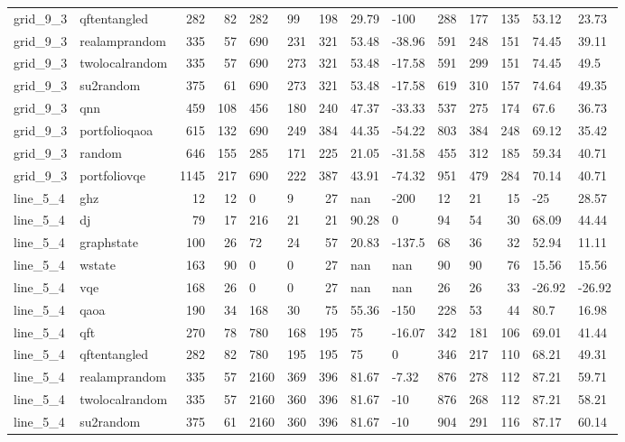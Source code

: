\begin{longtable}{llrrllrllllrll}
grid\_9\_3 & qftentangled & 282 & 82 & 282 & 99 & 198 & 29.79 & -100 & 288 & 177 & 135 & 53.12 & 23.73 \\
grid\_9\_3 & realamprandom & 335 & 57 & 690 & 231 & 321 & 53.48 & -38.96 & 591 & 248 & 151 & 74.45 & 39.11 \\
grid\_9\_3 & twolocalrandom & 335 & 57 & 690 & 273 & 321 & 53.48 & -17.58 & 591 & 299 & 151 & 74.45 & 49.5 \\
grid\_9\_3 & su2random & 375 & 61 & 690 & 273 & 321 & 53.48 & -17.58 & 619 & 310 & 157 & 74.64 & 49.35 \\
grid\_9\_3 & qnn & 459 & 108 & 456 & 180 & 240 & 47.37 & -33.33 & 537 & 275 & 174 & 67.6 & 36.73 \\
grid\_9\_3 & portfolioqaoa & 615 & 132 & 690 & 249 & 384 & 44.35 & -54.22 & 803 & 384 & 248 & 69.12 & 35.42 \\
grid\_9\_3 & random & 646 & 155 & 285 & 171 & 225 & 21.05 & -31.58 & 455 & 312 & 185 & 59.34 & 40.71 \\
grid\_9\_3 & portfoliovqe & 1145 & 217 & 690 & 222 & 387 & 43.91 & -74.32 & 951 & 479 & 284 & 70.14 & 40.71 \\
line\_5\_4 & ghz & 12 & 12 & 0 & 9 & 27 & nan & -200 & 12 & 21 & 15 & -25 & 28.57 \\
line\_5\_4 & dj & 79 & 17 & 216 & 21 & 21 & 90.28 & 0 & 94 & 54 & 30 & 68.09 & 44.44 \\
line\_5\_4 & graphstate & 100 & 26 & 72 & 24 & 57 & 20.83 & -137.5 & 68 & 36 & 32 & 52.94 & 11.11 \\
line\_5\_4 & wstate & 163 & 90 & 0 & 0 & 27 & nan & nan & 90 & 90 & 76 & 15.56 & 15.56 \\
line\_5\_4 & vqe & 168 & 26 & 0 & 0 & 27 & nan & nan & 26 & 26 & 33 & -26.92 & -26.92 \\
line\_5\_4 & qaoa & 190 & 34 & 168 & 30 & 75 & 55.36 & -150 & 228 & 53 & 44 & 80.7 & 16.98 \\
line\_5\_4 & qft & 270 & 78 & 780 & 168 & 195 & 75 & -16.07 & 342 & 181 & 106 & 69.01 & 41.44 \\
line\_5\_4 & qftentangled & 282 & 82 & 780 & 195 & 195 & 75 & 0 & 346 & 217 & 110 & 68.21 & 49.31 \\
line\_5\_4 & realamprandom & 335 & 57 & 2160 & 369 & 396 & 81.67 & -7.32 & 876 & 278 & 112 & 87.21 & 59.71 \\
line\_5\_4 & twolocalrandom & 335 & 57 & 2160 & 360 & 396 & 81.67 & -10 & 876 & 268 & 112 & 87.21 & 58.21 \\
line\_5\_4 & su2random & 375 & 61 & 2160 & 360 & 396 & 81.67 & -10 & 904 & 291 & 116 & 87.17 & 60.14 \\

\end{longtable}
